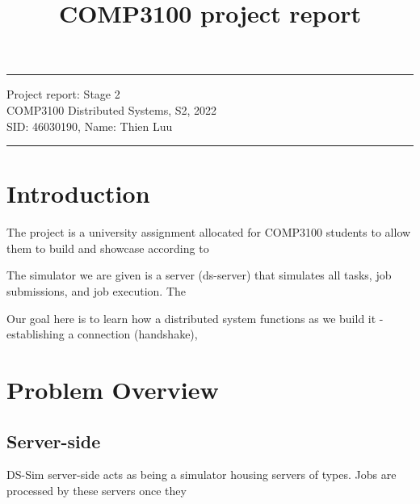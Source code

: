 \documentclass[a4paper]{article} %
\begin{document}

\title{COMP3100 project report} %
\fancyhead[C]{}
\hrule \medskip %
\begin{minipage}{1\textwidth} %
\centering 
\large %
Project report: Stage 2\\ %
COMP3100 Distributed Systems, S2, 2022\\
\normalsize %
SID: 46030190, Name: Thien Luu \cite{code}
\end{minipage}
\medskip\hrule %
\bigskip



\section{Introduction}
The project is a university assignment allocated for COMP3100 students to allow them to build and showcase according to 
\bigskip

The simulator we are given is a server (ds-server) that simulates all tasks, job submissions, and job execution. The 
\bigskip

Our goal here is to learn how a distributed system functions as we build it - establishing a connection (handshake), 


\section{Problem Overview}
\label{sec:section2}
\subsection*{Server-side}
DS-Sim server-side acts as being a simulator housing servers of types. Jobs are processed by these servers once they 
\end{document}
